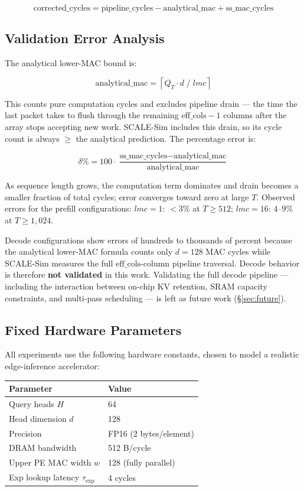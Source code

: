 \documentclass[11pt]{article}
\begin{document}
\[
\text{corrected\_cycles}
= \text{pipeline\_cycles} - \text{analytical\_mac} + \text{ss\_mac\_cycles}
\]

\subsection{Validation Error Analysis}

The analytical lower-MAC bound is:

\[
\text{analytical\_mac} = \left\lceil Q_T \cdot d \;/\; lmc \right\rceil
\]

This counts pure computation cycles and excludes pipeline drain ---
the time the last packet takes to flush through the remaining
\(\text{eff\_cols} - 1\) columns after the array stops accepting
new work.
SCALE-Sim includes this drain, so its cycle count is always
\(\geq\) the analytical prediction.
The percentage error is:

\[
\delta\% = 100 \cdot
\frac{\text{ss\_mac\_cycles} - \text{analytical\_mac}}
     {\text{analytical\_mac}}
\]

As sequence length grows, the computation term dominates and
drain becomes a smaller fraction of total cycles;
error converges toward zero at large \(T\).
Observed errors for the prefill configurations:
\(lmc = 1\): \(<3\%\) at \(T \geq 512\);
\(lmc = 16\): \(4\)--\(9\%\) at \(T \geq 1{,}024\).

Decode configurations show errors of hundreds to thousands
of percent because the analytical lower-MAC formula counts only
\(d = 128\) MAC cycles while SCALE-Sim measures the full
\(\text{eff\_cols}\)-column pipeline traversal.
Decode behavior is therefore \textbf{not validated} in this work.
Validating the full decode pipeline --- including the interaction
between on-chip KV retention, SRAM capacity constraints, and
multi-pass scheduling --- is left as future work (\S\ref{sec:future}).

\subsection{Fixed Hardware Parameters}

All experiments use the following hardware constants,
chosen to model a realistic edge-inference accelerator:

\begin{center}
\begin{tabular}{ll}
\toprule
Parameter & Value \\
\midrule
Query heads \(H\) & 64 \\
Head dimension \(d\) & 128 \\
Precision & FP16 (2 bytes/element) \\
DRAM bandwidth & 512 B/cycle \\
Upper PE MAC width \(w\) & 128 (fully parallel) \\
Exp lookup latency \(\tau_{\exp}\) & 4 cycles \\
\bottomrule
\end{tabular}
\end{center}
\end{document}
